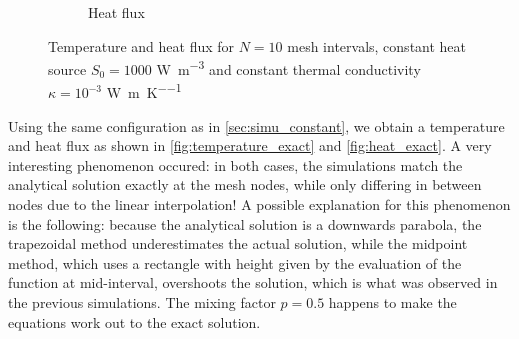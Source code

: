 \begin{figure}[h]
\begin{subfigure}{0.48\linewidth}
        \caption{Heat flux}
        \label{fig:heat_exact}
    \end{subfigure}
    \caption{Temperature and heat flux for \(N = 10\) mesh intervals, constant heat source \(S_0 = 1000\) \si{\watt\per\meter\cubed} and constant thermal conductivity \(\kappa = 10^{-3}\) \si{\watt\per\meter\per\kelvin}}
\end{figure}
Using the same configuration as in \autoref{sec:simu_constant}, we obtain a temperature and heat flux as shown in \autoref{fig:temperature_exact} and \autoref{fig:heat_exact}. A very interesting phenomenon occured: in both cases, the simulations match the analytical solution exactly at the mesh nodes, while only differing in between nodes due to the linear interpolation! A possible explanation for this phenomenon is the following: because the analytical solution is a downwards parabola, the trapezoidal method underestimates the actual solution, while the midpoint method, which uses a rectangle with height given by the evaluation of the function at mid-interval, overshoots the solution, which is what was observed in the previous simulations. The mixing factor \(p=0.5\) happens to make the equations work out to the exact solution.


